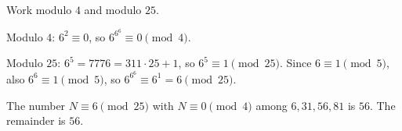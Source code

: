 Work modulo $4$ and modulo $25$.

Modulo $4$: $6^2\equiv0$, so $6^{6^6}\equiv0\pmod4$.

Modulo $25$: $6^5=7776=311\cdot25+1$, so $6^5\equiv1\pmod{25}$. Since $6\equiv1\pmod5$, also $6^6\equiv1\pmod5$, so $6^{6^6}\equiv6^1=6\pmod{25}$.

The number $N\equiv6\pmod{25}$ with $N\equiv0\pmod4$ among $6,31,56,81$ is $56$. The remainder is $\boxed{56}$.
